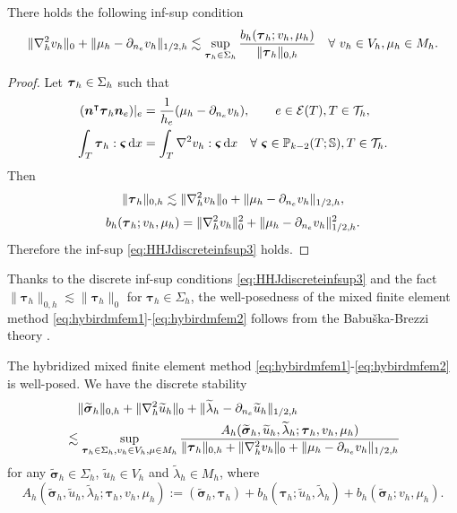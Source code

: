 \begin{lemma}
There holds the following inf-sup condition
\begin{equation}\label{eq:HHJdiscreteinfsup3}
\|\nabla_h^2v_h\|_{0}+\|\mu_h-\partial_{n_e}v_h\|_{1/2,h}\lesssim \sup_{\boldsymbol\tau_h\in\Sigma_h}\frac{b_h(\boldsymbol\tau_h;v_h,\mu_h)}{\|\boldsymbol\tau_h\|_{0,h}}\quad\forall~v_h\in V_h,\mu_h\in M_h.
\end{equation}
\end{lemma}
\begin{proof}
Let $\boldsymbol\tau_h\in\Sigma_h$ such that
\begin{align*}
(\boldsymbol{n}^{\intercal}\boldsymbol{\tau}_h\boldsymbol{n}_e)|_{e}&=\frac{1}{h_e}(\mu_h-\partial_{n_e}v_h),\qquad e\in\mathcal E(T), T\in\mathcal T_h,
\\
\int_T\boldsymbol\tau_h:\boldsymbol\varsigma\,{\rm d}x&=\int_T\nabla^2v_h:\boldsymbol\varsigma\,{\rm d}x\quad\forall~\boldsymbol\varsigma\in \mathbb P_{k-2}(T;\mathbb S), T\in\mathcal T_h.
\end{align*}
Then
\begin{equation*}
\|\boldsymbol\tau_h\|_{0,h}\lesssim \|\nabla_h^2v_h\|_{0} + \|\mu_h-\partial_{n_e}v_h\|_{1/2,h},
\end{equation*}
\[
b_h(\boldsymbol\tau_h;v_h,\mu_h)=\|\nabla_h^2v_h\|_{0}^2+\|\mu_h-\partial_{n_e}v_h\|_{1/2,h}^2.
\]
Therefore the inf-sup \eqref{eq:HHJdiscreteinfsup3} holds.
\end{proof}

Thanks to the discrete inf-sup conditions \eqref{eq:HHJdiscreteinfsup3} and the fact $\|\boldsymbol{\tau}_h\|_{0,h}\lesssim \|\boldsymbol{\tau}_h\|_{0}$ for $\boldsymbol{\tau}_h\in\Sigma_h$, the well-posedness of the mixed finite element method \eqref{eq:hybirdmfem1}-\eqref{eq:hybirdmfem2} follows from the Babu{\v{s}}ka-Brezzi theory \cite{BoffiBrezziFortin2013}.
\begin{theorem}
The hybridized mixed finite element method \eqref{eq:hybirdmfem1}-\eqref{eq:hybirdmfem2} is well-posed. We have the discrete stability 
\begin{align}
\notag
&\quad \|\widetilde{\boldsymbol{\sigma}}_h\|_{0,h}+\|\nabla_h^2\widetilde{u}_h\|_{0}+\|\widetilde{\lambda}_h-\partial_{n_e}\widetilde{u}_h\|_{1/2,h} \\
\label{eq:discretestability3}
&\lesssim\sup_{\boldsymbol{\tau}_h\in\Sigma_h, v_h\in V_h,\mu\in M_h}\frac{A_h(\widetilde{\boldsymbol{\sigma}}_h,\widetilde{u}_h,\widetilde{\lambda}_h;\boldsymbol{\tau}_h,v_h,\mu_h)}{\|\boldsymbol{\tau}_h\|_{0,h}+\|\nabla_h^2v_h\|_{0}+\|\mu_h-\partial_{n_e}v_h\|_{1/2,h}}    
\end{align}
for any $\widetilde{\boldsymbol{\sigma}}_h\in\Sigma_h$, $\widetilde{u}_h\in V_h$ and $\widetilde{\lambda}_h\in M_h$, where
$$
A_h(\widetilde{\boldsymbol{\sigma}}_h,\widetilde{u}_h,\widetilde{\lambda}_h;\boldsymbol{\tau}_h,v_h,\mu_h):=(\widetilde{\boldsymbol{\sigma}}_h,\boldsymbol{\tau}_h)+ b_h(\boldsymbol\tau_h; \widetilde{u}_h,\widetilde{\lambda}_h)+ b_h(\widetilde{\boldsymbol\sigma}_h; v_h,\mu_h).
$$
\end{theorem}


